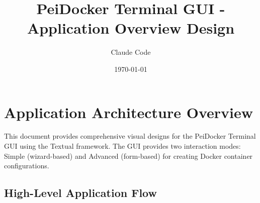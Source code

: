\documentclass[11pt,a4paper]{article}
\title{PeiDocker Terminal GUI - Application Overview Design}
\author{Claude Code}
\date{\today}
\begin{document}
\maketitle

\section{Application Architecture Overview}

This document provides comprehensive visual designs for the PeiDocker Terminal GUI using the Textual framework. The GUI provides two interaction modes: Simple (wizard-based) and Advanced (form-based) for creating Docker container configurations.

\subsection{High-Level Application Flow}
\end{document}
